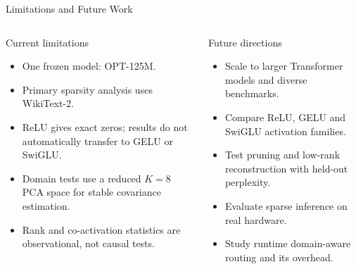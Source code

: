 \documentclass[aspectratio=169,10pt]{beamer}
\begin{document}
\begin{frame}{Limitations and Future Work}
\begin{columns}[T,onlytextwidth]
\begin{block}{Current limitations}
\begin{itemize}
  \item One frozen model: OPT-125M.
  \item Primary sparsity analysis uses WikiText-2.
  \item ReLU gives exact zeros; results do not automatically transfer to GELU or SwiGLU.
  \item Domain tests use a reduced $K=8$ PCA space for stable covariance estimation.
  \item Rank and co-activation statistics are observational, not causal tests.
\end{itemize}
\end{block}
\begin{exampleblock}{Future directions}
\begin{itemize}
  \item Scale to larger Transformer models and diverse benchmarks.
  \item Compare ReLU, GELU and SwiGLU activation families.
  \item Test pruning and low-rank reconstruction with held-out perplexity.
  \item Evaluate sparse inference on real hardware.
  \item Study runtime domain-aware routing and its overhead.
\end{itemize}
\end{exampleblock}
\end{columns}
\end{frame}
\end{document}
